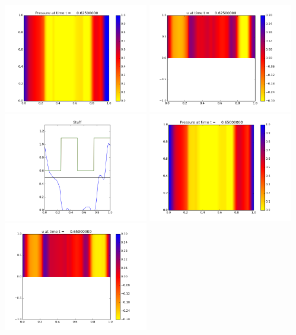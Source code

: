 \documentclass[11pt]{article}
\begin{document}
\vskip 10pt 
\includegraphics[width=0.475\textwidth]{frame0025fig0.png}
\includegraphics[width=0.475\textwidth]{frame0025fig1.png}
\vskip 10pt 
\includegraphics[width=0.475\textwidth]{frame0025fig3.png}
\vskip 10pt 
\includegraphics[width=0.475\textwidth]{frame0026fig0.png}
\includegraphics[width=0.475\textwidth]{frame0026fig1.png}
\end{document}
